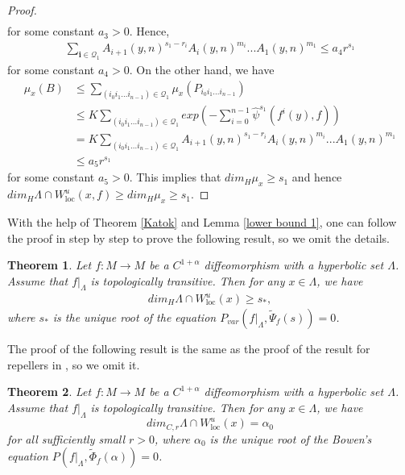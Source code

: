 \documentclass[11pt,a4paper]{amsart}
\theoremstyle{plain}
\newtheorem{Thm}{Theorem}[section]
\theoremstyle{remark}
\begin{document}
\begin{proof}
\begin{align*}
		\end{align*}
		for some constant $a_{3}>0$. Hence,
		\begin{align*}
			\sum_{\mathbf{i}\in\mathcal{Q}_{1}}A_{i+1}(y,n)^{s_{1}-r_{i}}A_{i}(y,n)^{m_{i}}...A_{1}(y,n)^{m_{1}}\leq a_{4}r^{s_{1}}
		\end{align*}
		for some constant $a_{4}>0$.
		On the other hand, we have
		\begin{align*}
			\mu_{x}(B)&\leq \sum_{(i_{0}i_{1}...i_{n-1})\in\mathcal{Q}_{1}}\mu_{x}(P_{i_{0}i_{1}...i_{n-1}})\\
			&\leq K \sum_{(i_{0}i_{1}...i_{n-1})\in\mathcal{Q}_{1}} exp(-\sum_{i=0}^{n-1}\hat{\psi}^{s_{1}}(f^{i}(y),f))\\
			&=K \sum_{(i_{0}i_{1}...i_{n-1})\in\mathcal{Q}_{1}} A_{i+1}(y,n)^{s_{1}-r_{i}}A_{i}(y,n)^{m_{i}}...A_{1}(y,n)^{m_{1}}\\
			&\leq a_{5}r^{s_{1}}
		\end{align*}
		for some constant $a_{5}>0$. This implies that $dim_{H}\mu_{x}\geq s_{1}$ and hence $dim_{H}\Lambda\cap W^{u}_{\text{loc}}(x,f)\geq dim_{H}\mu_{x}\geq s_{1}$.
	\end{proof}
	
	\fi
	
	
	With the help of Theorem \ref{Katok} and Lemma \ref{lower bound 1}, one can follow the proof in \cite{caopesinzhao2019} step by step to prove the following result, so we omit the details.
	\begin{Thm}\label{lower bound for hyperbolic}
		Let $f: M\rightarrow M$ be a $C^{1+\alpha}$ diffeomorphism with a hyperbolic set $\Lambda$. Assume that $f|_{\Lambda}$ is topologically transitive.  Then for any $x\in \Lambda$, we have
		\begin{align*}
			dim_{H}\Lambda\cap W^{u}_{\text{loc}}(x)\geq s_{\ast},
		\end{align*}
		where $s_{\ast}$ is the unique root of the equation $P_{var}(f|_{\Lambda},\tilde{\Psi}_{f}(s))=0$.
	\end{Thm}
	
	The proof of the following result is the same as the proof of the result for repellers in \cite{caopesinzhao2019}, so we omit it.
	\begin{Thm}\label{singular-valued dimension for hyperbolic}
		Let $f: M\rightarrow M$ be a $C^{1+\alpha}$ diffeomorphism with a hyperbolic set $\Lambda$. Assume that $f|_{\Lambda}$ is topologically transitive. Then for any $x\in \Lambda$, we have $$dim_{C,r} \Lambda \cap W^{u}_{\text{loc}}(x)=\alpha_{0}$$ for all sufficiently small $r>0$, where $\alpha_{0}$ is the unique root of the Bowen's equation $P(f|_{\Lambda},\tilde{\Phi}_{f}(\alpha))=0$.
	\end{Thm}
	
\end{document}
